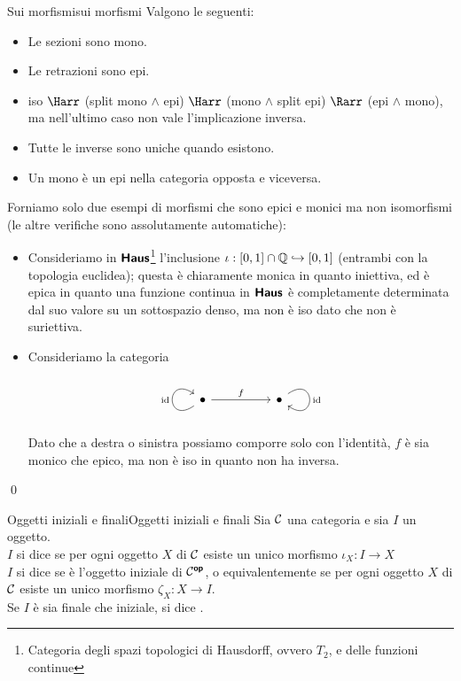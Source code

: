 \documentclass{article}
\renewcommand\C{\mc{C}}
\begin{document}
\begin{remark}{Sui morfismi}{sui morfismi}
    Valgono le seguenti:\begin{itemize}
        \item Le sezioni sono mono.
        \item Le retrazioni sono epi.
        \item iso $\Harr$ (split mono $\wedge$ epi) $\Harr$ (mono $\wedge$ split epi) $\Rarr$ (epi $\wedge$ mono), ma nell'ultimo caso non vale l'implicazione inversa.
        \item Tutte le inverse sono uniche quando esistono.
        \item Un mono è un epi nella categoria opposta e viceversa.
    \end{itemize}
    \proof 
    Forniamo solo due esempi di morfismi che sono epici e monici ma non isomorfismi (le altre verifiche sono assolutamente automatiche):\begin{itemize}
        \item Consideriamo in $\text{\sffamily\textbf{Haus}}$\footnote{Categoria degli spazi topologici di Hausdorff, ovvero $T_2$, e delle funzioni continue} l'inclusione $\iota: [0,1]\cap \mathbb{Q}\hookrightarrow[0,1]$ (entrambi con la topologia euclidea); questa è chiaramente monica in quanto iniettiva, ed è epica in quanto una funzione continua in $\text{\sffamily\textbf{Haus}}$ è completamente determinata dal suo valore su un sottospazio denso, ma non è iso dato che non è suriettiva.
        \item Consideriamo la categoria
        \[\begin{tikzcd}
        	\bullet && \bullet
    	    \arrow["\id", from=1-1, to=1-1, loop, in=145, out=215, distance=10mm]
        	\arrow["f", from=1-1, to=1-3]
    	    \arrow["\id", from=1-3, to=1-3, loop, in=325, out=35, distance=10mm]
        \end{tikzcd}\]
        Dato che a destra o sinistra possiamo comporre solo con l'identità, $f$ è sia monico che epico, ma non è iso in quanto non ha inversa.
    \end{itemize}
    \qed
\end{remark}

\begin{definition}{Oggetti iniziali e finali}{Oggetti iniziali e finali}
    Sia $\C$ una categoria e sia $I$ un oggetto.\\
    $I$ si dice  se per ogni oggetto $X$ di $\C$ esiste un unico morfismo $\iota_X:I\to X$\\
    $I$ si dice  se è l'oggetto iniziale di $\C^\op$, o equivalentemente se per ogni oggetto $X$ di $\C$ esiste un unico morfismo $\zeta_X : X\to I$.\\
    Se $I$ è sia finale che iniziale, si dice .
\end{definition}
\end{document}
